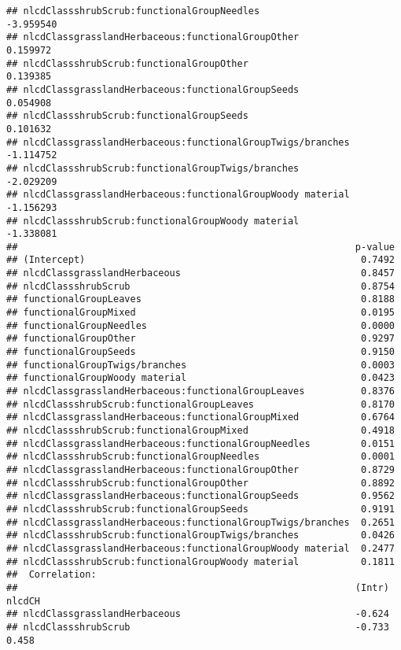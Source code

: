\documentclass[]{article}
\begin{document}
\begin{verbatim}
## nlcdClassshrubScrub:functionalGroupNeedles                 -3.959540
## nlcdClassgrasslandHerbaceous:functionalGroupOther           0.159972
## nlcdClassshrubScrub:functionalGroupOther                    0.139385
## nlcdClassgrasslandHerbaceous:functionalGroupSeeds           0.054908
## nlcdClassshrubScrub:functionalGroupSeeds                    0.101632
## nlcdClassgrasslandHerbaceous:functionalGroupTwigs/branches -1.114752
## nlcdClassshrubScrub:functionalGroupTwigs/branches          -2.029209
## nlcdClassgrasslandHerbaceous:functionalGroupWoody material -1.156293
## nlcdClassshrubScrub:functionalGroupWoody material          -1.338081
##                                                            p-value
## (Intercept)                                                 0.7492
## nlcdClassgrasslandHerbaceous                                0.8457
## nlcdClassshrubScrub                                         0.8754
## functionalGroupLeaves                                       0.8188
## functionalGroupMixed                                        0.0195
## functionalGroupNeedles                                      0.0000
## functionalGroupOther                                        0.9297
## functionalGroupSeeds                                        0.9150
## functionalGroupTwigs/branches                               0.0003
## functionalGroupWoody material                               0.0423
## nlcdClassgrasslandHerbaceous:functionalGroupLeaves          0.8376
## nlcdClassshrubScrub:functionalGroupLeaves                   0.8170
## nlcdClassgrasslandHerbaceous:functionalGroupMixed           0.6764
## nlcdClassshrubScrub:functionalGroupMixed                    0.4918
## nlcdClassgrasslandHerbaceous:functionalGroupNeedles         0.0151
## nlcdClassshrubScrub:functionalGroupNeedles                  0.0001
## nlcdClassgrasslandHerbaceous:functionalGroupOther           0.8729
## nlcdClassshrubScrub:functionalGroupOther                    0.8892
## nlcdClassgrasslandHerbaceous:functionalGroupSeeds           0.9562
## nlcdClassshrubScrub:functionalGroupSeeds                    0.9191
## nlcdClassgrasslandHerbaceous:functionalGroupTwigs/branches  0.2651
## nlcdClassshrubScrub:functionalGroupTwigs/branches           0.0426
## nlcdClassgrasslandHerbaceous:functionalGroupWoody material  0.2477
## nlcdClassshrubScrub:functionalGroupWoody material           0.1811
##  Correlation: 
##                                                            (Intr) nlcdCH
## nlcdClassgrasslandHerbaceous                               -0.624       
## nlcdClassshrubScrub                                        -0.733  0.458

\end{verbatim}
\end{document}
